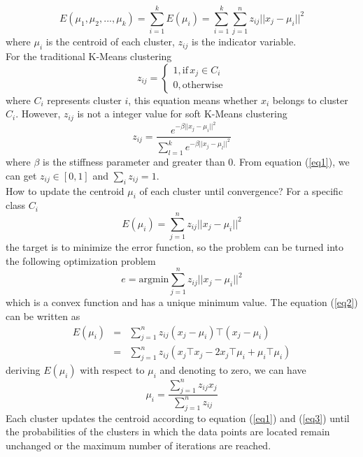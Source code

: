 \documentclass[11pt]{report}
\begin{document}
	\begin{equation}
	E\left(\mu_1,\mu_2,...,\mu_k\right) = \sum_{i=1}^{k}E\left(\mu_i\right) = \sum_{i=1}^{k}\sum_{j=1}^{n}z_{ij} ||x_j-\mu_i||^2
	\end{equation}
	where $\mu_i$ is the centroid of each cluster, $z_{ij}$ is the indicator variable. \\ 
	For the traditional K-Means clustering 
	\begin{equation}
	z_{ij} = \left\{ \begin{array}{ll}
	1, \text{if}\,x_{j} \in C_{i}\\
	0, \text{otherwise}
	\end{array} \right.
	\end{equation}
	where $C_{i}$ represents cluster $i$, this equation means whether $x_{i}$ belongs to cluster $C_{i}$. However, $z_{ij}$ is not a integer value for soft K-Means clustering 
	\begin{equation}
	\label{eq1}
	z_{ij} = \frac{e^{-\beta ||x_{j}-\mu_i||^2}}{\sum_{l=1}^{k}e^{-\beta||x_{j}-\mu_l||^2}}
	\end{equation}
	where $\beta$ is the stiffness parameter and greater than 0. 
	From equation (\ref{eq1}), we can get $z_{ij} \in [0,1]$ and $\sum_{i}z_{ij}=1$.\\
	How to update the centroid $\mu_{i}$ of each cluster until convergence? For a specific class $C_{i}$
	\begin{equation}
	\label{eq2}
	E\left(\mu_{i}\right) = \sum_{j=1}^{n}z_{ij}||x_{j}-\mu_{i}||^2
	\end{equation}
	the target is to minimize the error function, so the problem can be turned into the following optimization problem
	\begin{equation}
	e = \text{argmin}\sum_{j=1}^{n}z_{ij}||x_{j}-\mu_{i}||^2
	\end{equation}
	which is a convex function and has a unique minimum value. The equation (\ref{eq2}) can be written as
	\begin{eqnarray}
	E\left(\mu_{i}\right) &=& \sum_{j=1}^{n}z_{ij}\left(x_j-\mu_{i}\right)\top \left(x_j-\mu_{i}\right)\\
	 &=& \sum_{j=1}^{n}z_{ij}\left(x_j \top x_j-2x_j \top \mu_{i} + \mu_{i} \top \mu_{i}\right)
	\end{eqnarray}
	deriving $E\left(\mu_{i}\right)$ with respect to $\mu_{i}$ and denoting to zero, we can have
	\begin{equation}
	\label{eq3}
	\mu_{i} = \frac{\sum_{j=1}^{n}z_{ij}x_j}{\sum_{j=1}^{n}z_{ij}}
	\end{equation}
	Each cluster updates the centroid according to equation (\ref{eq1}) and (\ref{eq3}) until the probabilities of the clusters in which the data points are located remain unchanged or the maximum number of iterations are reached. \\
\end{document}
